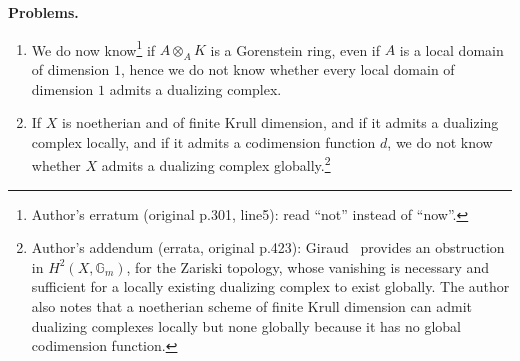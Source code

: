 \par\medskip\noindent\textbf{Problems.}
\begin{enumerate}
\item We do now know\footnote{Author's erratum (original p.301, line5): read ``not'' instead of ``now''.} if $\widehat{A}\otimes_A K$ is a Gorenstein ring, even if $A$ is a local domain of dimension $1$, hence we do not know whether every local domain of dimension $1$ admits a dualizing complex.
\item If $X$ is noetherian and of finite Krull dimension, and if it admits a dualizing complex locally, and if it admits a codimension function $d$, we do not know whether $X$ admits a dualizing complex globally.\footnote{Author's addendum (errata, original p.423): Giraud~\cite{6} provides an obstruction in $H^2(X,\mathbb{G}_m)$, for the Zariski topology, whose vanishing is necessary and sufficient for a locally existing dualizing complex to exist globally. The author also notes that a noetherian scheme of finite Krull dimension can admit dualizing complexes locally but none globally because it has no global codimension function.}
\end{enumerate}
\par\medskip
